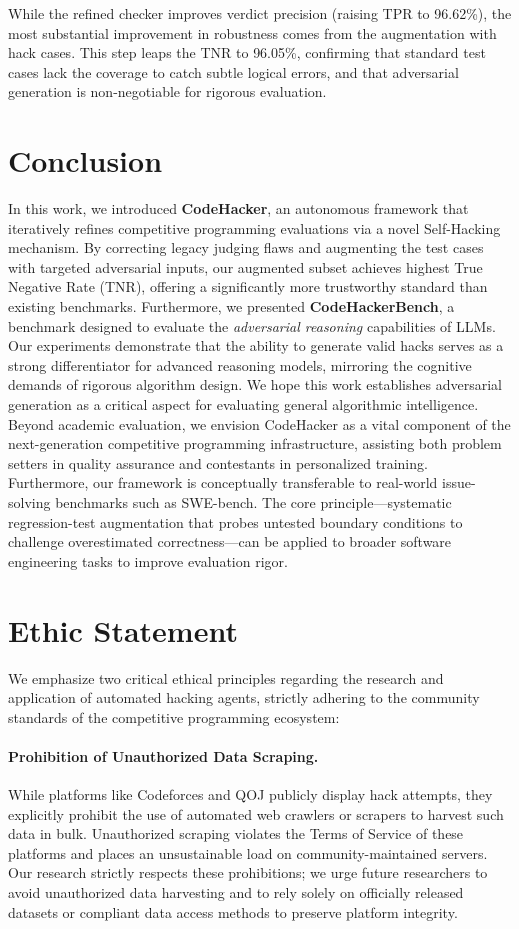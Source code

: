 \documentclass[11pt]{article}
\begin{document}
While the refined checker improves verdict precision (raising TPR to 96.62\%), the most substantial improvement in robustness comes from the augmentation with hack cases. This step leaps the TNR to 96.05\%, confirming that standard test cases lack the coverage to catch subtle logical errors, and that adversarial generation is non-negotiable for rigorous evaluation.
\section{Conclusion}
In this work, we introduced \textbf{CodeHacker}, an autonomous framework that iteratively refines competitive programming evaluations via a novel Self-Hacking mechanism. By correcting legacy judging flaws and augmenting the test cases with targeted adversarial inputs, our augmented subset achieves highest True Negative Rate (TNR), offering a significantly more trustworthy standard than existing benchmarks. Furthermore, we presented \textbf{CodeHackerBench}, a benchmark designed to evaluate the \textit{adversarial reasoning} capabilities of LLMs. Our experiments demonstrate that the ability to generate valid hacks serves as a strong differentiator for advanced reasoning models, mirroring the cognitive demands of rigorous algorithm design. We hope this work establishes adversarial generation as a critical aspect for evaluating general algorithmic intelligence. Beyond academic evaluation, we envision CodeHacker as a vital component of the next-generation competitive programming infrastructure, assisting both problem setters in quality assurance and contestants in personalized training. {Furthermore, our framework is conceptually transferable to real-world issue-solving benchmarks such as SWE-bench. The core principle—systematic regression-test augmentation that probes untested boundary conditions to challenge overestimated correctness—can be applied to broader software engineering tasks to improve evaluation rigor.}

\clearpage
\newpage
\section*{Ethic Statement}
\label{sec:ethics}

We emphasize two critical ethical principles regarding the research and application of automated hacking agents, strictly adhering to the community standards of the competitive programming ecosystem:

\paragraph{Prohibition of Unauthorized Data Scraping.}
While platforms like Codeforces and QOJ publicly display hack attempts, they explicitly prohibit the use of automated web crawlers or scrapers to harvest such data in bulk. Unauthorized scraping violates the Terms of Service of these platforms and places an unsustainable load on community-maintained servers. Our research strictly respects these prohibitions; we urge future researchers to avoid unauthorized data harvesting and to rely solely on officially released datasets or compliant data access methods to preserve platform integrity.
\end{document}
